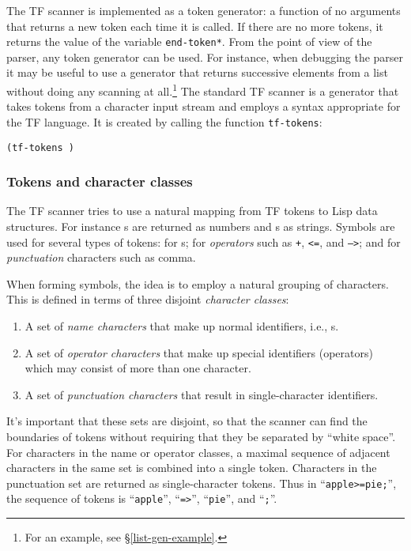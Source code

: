 The TF scanner is implemented as a token generator: a function of no
arguments that returns a new token each time it is called.  If there
are no more tokens, it returns the value of the variable {\tt *end-token*}.
From the point of view of the parser, any token generator can be used.
For instance, when debugging the parser it may be useful to use a
generator that returns successive elements from a list without doing
any scanning at all.\footnote{For an example, see \S\ref{list-gen-example}.}
The standard TF scanner is a generator that takes tokens from a
character input stream and employs a syntax appropriate for the TF
language.  It is created by calling the function {\tt tf-tokens}:

\begin{tabbing}
{\tt (tf-tokens )} \MapsTo {}
\end{tabbing}

\subsubsection{Tokens and character classes}

The TF scanner tries to use a natural mapping from TF tokens to Lisp
data structures.  For instance s are returned as numbers
and s as strings.  Symbols are used for several
types of tokens: for s; for {\em operators\/} such as {\tt +},
{\tt <=}, and {\tt --->}; and for {\em punctuation\/} characters such
as comma.

When forming symbols, the idea is to employ a natural grouping of
characters.  This is defined in terms of three disjoint {\em character
classes}:

\begin{enumerate}
\item A set of {\em name characters\/} that make up normal identifiers,
      i.e., s.
\item A set of {\em operator characters} that make up special
      identifiers (operators) which may consist of more than
      one character.
\item A set of {\em punctuation characters} that result in
      single-character identifiers.
\end{enumerate}

It's important that these sets are disjoint, so that the scanner can
find the boundaries of tokens without requiring that they be separated
by ``white space''.  For characters in the name or operator classes, a
maximal sequence of adjacent characters in the same set is combined
into a single token.  Characters in the punctuation set are returned
as single-character tokens.  Thus in ``\verb|apple>=pie;|'', the
sequence of tokens is ``{\tt apple}'', ``{\tt =>}'', ``{\tt pie}'',
and ``\verb|;|''.  %

